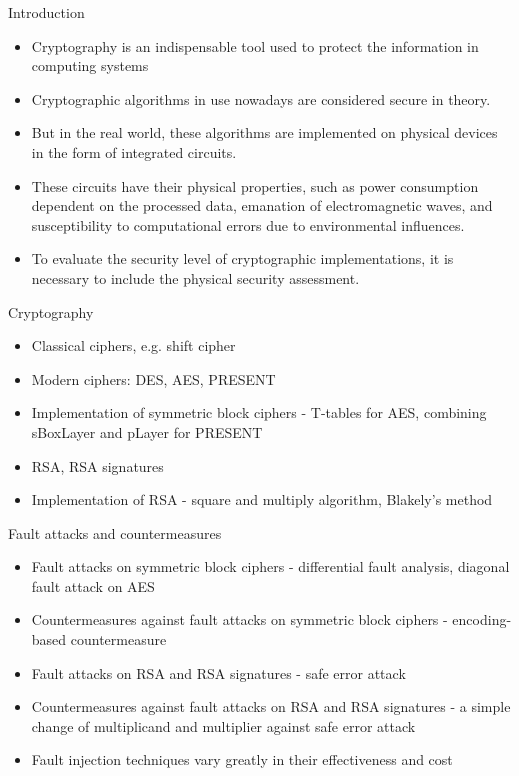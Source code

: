 \begin{frame}{Introduction}
    \begin{itemize}
        \item Cryptography is an indispensable tool used to protect the information in computing systems
        \item Cryptographic algorithms in use nowadays are considered secure in theory.
        \item But in the real world, these algorithms are implemented on physical devices in the form of integrated circuits.
        \item These circuits have their physical properties, such as power consumption dependent on the processed data, emanation of electromagnetic waves, and susceptibility to computational errors due to environmental influences.
        \item To evaluate the security level of cryptographic implementations, it is necessary to include the physical security assessment.
    \end{itemize}
\end{frame}

\begin{frame}{Cryptography}
    \begin{itemize}
        \item Classical ciphers, e.g. shift cipher
        \item Modern ciphers: DES, AES, PRESENT
        \item Implementation of symmetric block ciphers - T-tables for AES, combining sBoxLayer and pLayer for PRESENT
        \item RSA, RSA signatures
        \item Implementation of RSA - square and multiply algorithm, Blakely's method
    \end{itemize}
\end{frame}

\begin{frame}{Fault attacks and countermeasures}
    \begin{itemize}
        \item Fault attacks on symmetric block ciphers - differential fault analysis, diagonal fault attack on AES
        \item Countermeasures against fault attacks on symmetric block ciphers - encoding-based countermeasure
        \item Fault attacks on RSA and RSA signatures - safe error attack
        \item Countermeasures against fault attacks on RSA and RSA signatures - a simple change of multiplicand and multiplier against safe error attack
        \item Fault injection techniques vary greatly in their effectiveness and cost
    \end{itemize}
\end{frame}

